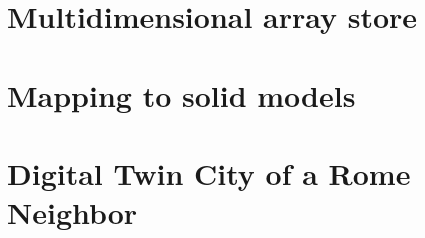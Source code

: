 \section{ Multidimensional array store}\label{sect:11-3}


\section{ Mapping to solid models}\label{sect:11-4}


%
%



\section{ Digital Twin City of a Rome Neighbor}\label{sect:11-5}


